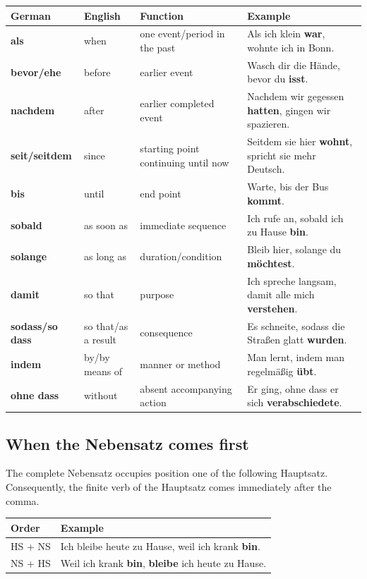 \begin{center}
\small
{}
\begin{tabularx}{\textwidth}{@{}>{\bfseries}l l l X@{}}
\toprule
German & English & Function & Example \\
\midrule
als & when & one event/period in the past & Als ich klein \textbf{war}, wohnte ich in Bonn. \\
bevor/ehe & before & earlier event & Wasch dir die Hände, bevor du \textbf{isst}. \\
nachdem & after & earlier completed event & Nachdem wir gegessen \textbf{hatten}, gingen wir spazieren. \\
seit/seitdem & since & starting point continuing until now & Seitdem sie hier \textbf{wohnt}, spricht sie mehr Deutsch. \\
bis & until & end point & Warte, bis der Bus \textbf{kommt}. \\
sobald & as soon as & immediate sequence & Ich rufe an, sobald ich zu Hause \textbf{bin}. \\
solange & as long as & duration/condition & Bleib hier, solange du \textbf{möchtest}. \\
damit & so that & purpose & Ich spreche langsam, damit alle mich \textbf{verstehen}. \\
sodass/so dass & so that/as a result & consequence & Es schneite, sodass die Straßen glatt \textbf{wurden}. \\
indem & by/by means of & manner or method & Man lernt, indem man regelmäßig \textbf{übt}. \\
ohne dass & without & absent accompanying action & Er ging, ohne dass er sich \textbf{verabschiedete}. \\
\bottomrule
\end{tabularx}
\end{center}

\subsection{When the Nebensatz comes first}

The complete Nebensatz occupies position one of the following Hauptsatz.
Consequently, the finite verb of the Hauptsatz comes immediately after the
comma.

\begin{center}
\begin{tabularx}{\textwidth}{@{}l X@{}}
\toprule
Order & Example \\
\midrule
HS + NS & Ich bleibe heute zu Hause, weil ich krank \textbf{bin}. \\
NS + HS & Weil ich krank \textbf{bin}, \textbf{bleibe} ich heute zu Hause. \\
\bottomrule
\end{tabularx}
\end{center}

